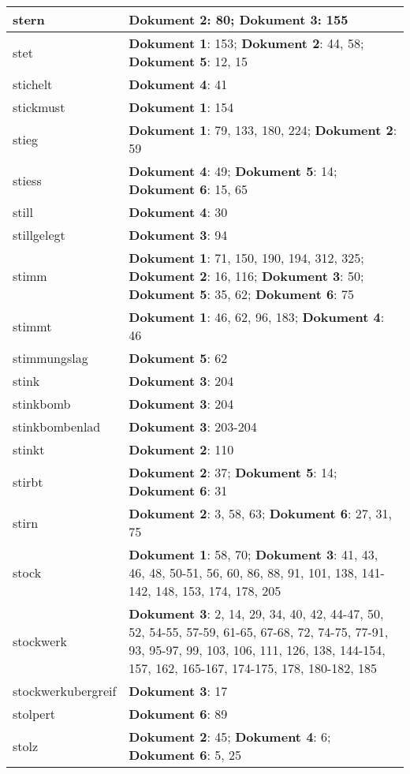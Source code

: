 \documentclass[a5paper]{article}
\begin{document}
\begin{longtable}[l]{|l|p{3in}|}
\hline
stern & \textbf{Dokument 2}: 80; \textbf{Dokument 3}: 155 \\
\hline
stet & \textbf{Dokument 1}: 153; \textbf{Dokument 2}: 44, 58; \textbf{Dokument 5}: 12, 15 \\
\hline
stichelt & \textbf{Dokument 4}: 41 \\
\hline
stickmust & \textbf{Dokument 1}: 154 \\
\hline
stieg & \textbf{Dokument 1}: 79, 133, 180, 224; \textbf{Dokument 2}: 59 \\
\hline
stiess & \textbf{Dokument 4}: 49; \textbf{Dokument 5}: 14; \textbf{Dokument 6}: 15, 65 \\
\hline
still & \textbf{Dokument 4}: 30 \\
\hline
stillgelegt & \textbf{Dokument 3}: 94 \\
\hline
stimm & \textbf{Dokument 1}: 71, 150, 190, 194, 312, 325; \textbf{Dokument 2}: 16, 116; \textbf{Dokument 3}: 50; \textbf{Dokument 5}: 35, 62; \textbf{Dokument 6}: 75 \\
\hline
stimmt & \textbf{Dokument 1}: 46, 62, 96, 183; \textbf{Dokument 4}: 46 \\
\hline
stimmungslag & \textbf{Dokument 5}: 62 \\
\hline
stink & \textbf{Dokument 3}: 204 \\
\hline
stinkbomb & \textbf{Dokument 3}: 204 \\
\hline
stinkbombenlad & \textbf{Dokument 3}: 203-204 \\
\hline
stinkt & \textbf{Dokument 2}: 110 \\
\hline
stirbt & \textbf{Dokument 2}: 37; \textbf{Dokument 5}: 14; \textbf{Dokument 6}: 31 \\
\hline
stirn & \textbf{Dokument 2}: 3, 58, 63; \textbf{Dokument 6}: 27, 31, 75 \\
\hline
stock & \textbf{Dokument 1}: 58, 70; \textbf{Dokument 3}: 41, 43, 46, 48, 50-51, 56, 60, 86, 88, 91, 101, 138, 141-142, 148, 153, 174, 178, 205 \\
\hline
stockwerk & \textbf{Dokument 3}: 2, 14, 29, 34, 40, 42, 44-47, 50, 52, 54-55, 57-59, 61-65, 67-68, 72, 74-75, 77-91, 93, 95-97, 99, 103, 106, 111, 126, 138, 144-154, 157, 162, 165-167, 174-175, 178, 180-182, 185 \\
\hline
stockwerkubergreif & \textbf{Dokument 3}: 17 \\
\hline
stolpert & \textbf{Dokument 6}: 89 \\
\hline
stolz & \textbf{Dokument 2}: 45; \textbf{Dokument 4}: 6; \textbf{Dokument 6}: 5, 25 \\

\end{longtable}
\end{document}

